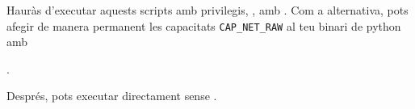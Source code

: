 \vfill

\begin{center}
\end{center}

\begin{center}
\end{center}

\begin{remark}
Hauràs d'executar aquests scripts amb privilegis, \eg, amb .
% 
Com a alternativa, pots afegir de manera permanent les capacitats \texttt{CAP\_NET\_RAW}
al teu binari de python amb
\begin{center}
.  
\end{center}
% 
Després, pots executar  directament sense .\\[-0.5cm]
\end{remark}
